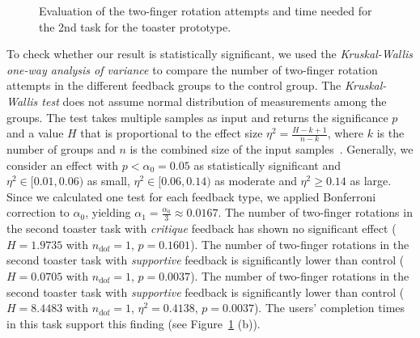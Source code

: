 \documentclass[manuscript]{acmart}
\begin{document}
			\begin{figure}[H]
				\centering
				\caption{Evaluation of the two-finger rotation attempts and time needed for the 2nd task for the toaster prototype.}
				\label{fig:t2_metrics}
			\end{figure}

			To check whether our result is statistically significant, we used the \emph{Kruskal-Wallis one-way analysis of variance} to compare the number of two-finger rotation attempts in the different feedback groups to the control group. The \emph{Kruskal-Wallis test} does not assume normal distribution of measurements among the groups. The test takes multiple samples as input and returns the significance $p$ and a value $H$ that is proportional to the effect size $\eta^2 = \frac{H-k+1}{n-k}$, where $k$ is the number of groups and $n$ is the combined size of the input samples~\cite{Tomczak2014}. Generally, we consider an effect with $p < \alpha_0 = 0.05$ as statistically significant and $\eta^2 \in [0.01,0.06)$ as small, $\eta^2 \in [0.06,0.14)$ as moderate and $\eta^2 \geq 0.14$ as large. Since we calculated one test for each feedback type, we applied Bonferroni correction to $\alpha_0$, yielding $\alpha_1 = \frac{\alpha_0}{3} \approx 0.0167$. The number of two-finger rotations in the second toaster task with \emph{critique} feedback has shown no significant effect ($H = 1.9735$ with $n_\text{dof} = 1$, $p = 0.1601$). The number of two-finger rotations in the second toaster task with \emph{supportive} feedback is significantly lower than control ($H = 0.0705$ with $n_\text{dof} = 1$, $p = 0.0037$). The number of two-finger rotations in the second toaster task with \emph{supportive} feedback is significantly lower than control ($H = 8.4483$ with $n_\text{dof} = 1$, $\eta^2 = 0.4138$, $p = 0.0037$). The users' completion times in this task support this finding (see Figure~\ref{fig:t2_metrics} (b)).
\end{document}
